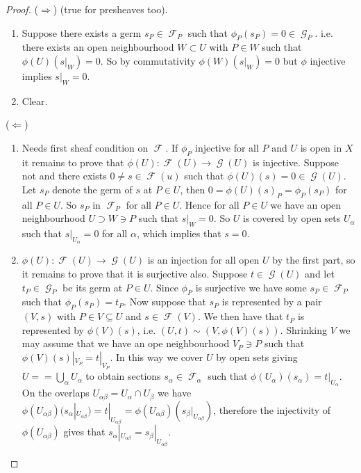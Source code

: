\documentclass[10pt,]{book}
\theoremstyle{plain}
\theoremstyle{definition}
\DeclareMathOperator{\F}{\mathcal{F}}
\DeclareMathOperator{\G}{\mathcal{G}}
\begin{document}
\begin{proof}
(\(\Rightarrow\)) (true for presheaves too).
              \begin{enumerate}
\item{}Suppose there exists a germ \(s_P\in\F_P\) such that \(\phi_P(s_P) = 0\in \G_P\).
                  i.e. there exists an open neighbourhood \(W \subset U\) with \(P\in W\) such that \(\phi(U)(s|_W) = 0\).
                  So by commutativity \(\phi(W)(s|_W) = 0\) but \(\phi\) injective implies \(s|_W = 0\).
                \item{}Clear.\end{enumerate}

              (\(\Leftarrow\))
              \begin{enumerate}
\item{}Needs first sheaf condition on \(\F\).
                  If \(\phi_P\) injective for all \(P\) and \(U\) is open in \(X\) it remains to prove that \(\phi(U) \colon \F(U) \to \G(U)\) is injective.
                  Suppose not and there exists \(0 \ne s \in \F(u)\) such that \(\phi(U)(s) = 0 \in \G(U)\).
                  Let \(s_P\) denote the germ of \(s\) at \(P \in U\), then \(0 = \phi(U)(s)_P = \phi_P(s_P)\) for all \(P\in U\).
                  So \(s_P\) in \(\F_P\) for all \(P \in U\).
                  Hence for all \(P\in U\) we have an open neighbourhood \(U \supset W \ni P\) such that \(s|_W = 0\).
                  So \(U\) is covered by open sets \(U_\alpha\) such that \(s|_{U_\alpha} = 0\) for all \(\alpha\), which implies that \(s = 0\).
                \item{}\(\phi(U) \colon \F(U) \to \G(U)\) is an injection for all open \(U\) by the first part, so it remains to prove that it is surjective also.
                  Suppose \(t \in \G(U)\) and let \(t_P\in\G_P\) be its germ at \(P\in U\).
                  Since \(\phi_P\) is surjective we have some \(s_P\in \F_P\) such that \(\phi_P(s_P) = t_P\).
                  Now suppose that \(s_P\) is represented by a pair \((V,s)\) with \(P\in V \subseteq U\) and \(s\in \F(V)\).
                  We then have that \(t_P\) is represented by \(\phi(V)(s)\), i.e. \((U,t)\sim (V,\phi(V)(s))\).
                  Shrinking \(V\) we may assume that we have an ope neighbourhood \(V_P\ni P\) such that \(\phi(V)(s)|_{V_P} = t|_{V_P}\).
                  In this way we cover \(U\) by open sets giving \(U = = \bigcup_{\alpha} U_\alpha\) to obtain sections \(s_\alpha \in\F_\alpha\) such that \(\phi(U_\alpha)(s_\alpha) = t|_{U_\alpha}\).
                  On the overlaps \(U_{\alpha\beta} = U_\alpha \cap U_\beta\) we have \(\phi(U_{\alpha\beta})(s_\alpha|_{U_{\alpha\beta}}) = t|_{U_{\alpha\beta}} = \phi(U_{\alpha\beta})(s_\beta|_{U_{\alpha\beta}})\), therefore the injectivity of \(\phi(U_{\alpha\beta})\) gives that \(s_\alpha|_{U_{\alpha\beta}} = s_\beta|_{U_{\alpha\beta}}\).

\end{enumerate}
\end{proof}
\end{document}
